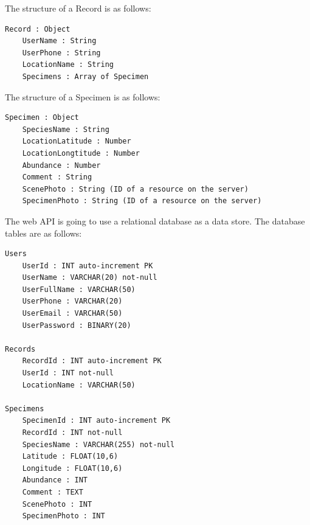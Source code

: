 The structure of a Record is as follows:
\begin {verbatim}
Record : Object
    UserName : String
    UserPhone : String
    LocationName : String 
    Specimens : Array of Specimen
\end {verbatim}

The structure of a Specimen is as follows:
\begin {verbatim}
Specimen : Object
    SpeciesName : String
    LocationLatitude : Number
    LocationLongtitude : Number
    Abundance : Number
    Comment : String
    ScenePhoto : String (ID of a resource on the server)
    SpecimenPhoto : String (ID of a resource on the server)
\end {verbatim}

The web API is going to use a relational database as a data store.
The database tables are as follows:

\begin {verbatim}
Users
    UserId : INT auto-increment PK
    UserName : VARCHAR(20) not-null
    UserFullName : VARCHAR(50)
    UserPhone : VARCHAR(20)
    UserEmail : VARCHAR(50)
    UserPassword : BINARY(20)
    
Records
    RecordId : INT auto-increment PK
    UserId : INT not-null
    LocationName : VARCHAR(50)
    
Specimens
    SpecimenId : INT auto-increment PK
    RecordId : INT not-null
    SpeciesName : VARCHAR(255) not-null
    Latitude : FLOAT(10,6)
    Longitude : FLOAT(10,6)
    Abundance : INT
    Comment : TEXT
    ScenePhoto : INT
    SpecimenPhoto : INT   
\end {verbatim}